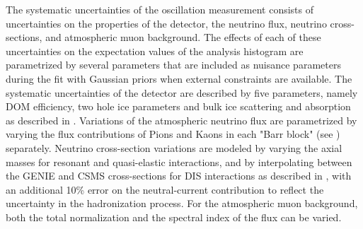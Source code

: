 The systematic uncertainties of the oscillation measurement consists of uncertainties on the properties of the detector, the neutrino flux, neutrino cross-sections, and atmospheric muon background. The effects of each of these uncertainties on the expectation values of the analysis histogram are parametrized by several parameters that are included as nuisance parameters during the fit with Gaussian priors when external constraints are available. The systematic uncertainties of the detector are described by five parameters, namely DOM efficiency, two hole ice parameters and bulk ice scattering and absorption as described in . Variations of the atmospheric neutrino flux are parametrized by varying the flux contributions of Pions and Kaons in each "Barr block" (see ) separately. Neutrino cross-section variations are modeled by varying the axial masses for resonant and quasi-elastic interactions, and by interpolating between the \textsc{GENIE} and \textsc{CSMS} cross-sections for DIS interactions as described in , with an additional 10\% error on the neutral-current contribution to reflect the uncertainty in the hadronization process. For the atmospheric muon background, both the total normalization and the spectral index of the flux can be varied.

